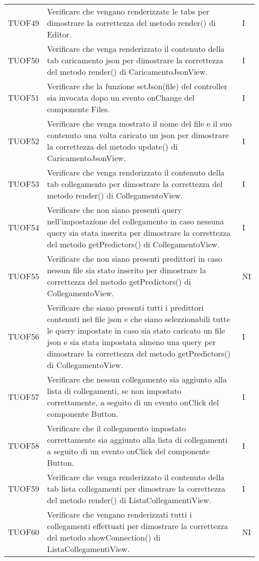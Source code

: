 \begin{longtable}{C{2cm} L{8cm} C{2cm}}

TUOF49 & Verificare che vengano renderizzate le tabs per dimostrare la correttezza del metodo render() di Editor. & I \\
TUOF50 & Verificare che venga renderizzato il contenuto della tab caricamento json per dimostrare la correttezza del metodo render() di CaricamentoJsonView. & I \\
TUOF51 & Verificare che la funzione setJson(file) del controller sia invocata dopo un evento onChange del componente Files. & I \\
TUOF52& Verificare che venga mostrato il nome del file e il suo contenuto una volta caricato un json per dimostrare la correttezza del metodo update() di CaricamentoJsonView. & I \\
TUOF53 & Verificare che venga renderizzato il contenuto della tab collegamento per dimostrare la correttezza del metodo render() di CollegamentoView. & I \\
TUOF54 & Verificare che non siano presenti query nell'impostazione del collegamento in caso nessuna query sia stata inserita per dimostrare la correttezza del metodo getPredictors() di CollegamentoView. & I \\
TUOF55 & Verificare che non siano presenti predittori in caso nessun file sia stato inserito per dimostrare la correttezza del metodo getPredictors() di CollegamentoView. & NI \\
TUOF56 & Verificare che siano presenti tutti i predittori contenuti nel file json e che siano selezzionabili tutte le query impostate in caso sia stato caricato un file json e sia stata impostata almeno una query per dimostrare la correttezza del metodo getPredictors() di CollegamentoView. & I \\
TUOF57 & Verificare che nessun collegamento sia aggiunto alla lista di collegamenti, se non impostato correttamente, a seguito di un evento onClick del componente Button. & I \\
TUOF58 & Verificare che il collegamento impostato correttamente sia aggiunto alla lista di collegamenti a seguito di un evento onClick del componente Button. & I \\
TUOF59 & Verificare che venga renderizzato il contenuto della tab lista collegamenti per dimostrare la correttezza del metodo render() di ListaCollegamentiView. & I \\
TUOF60 & Verificare che vengano renderizzati tutti i collegamenti effettuati per dimostrare la correttezza del metodo showConnection() di ListaCollegamentiView. & NI \\

\end{longtable}

